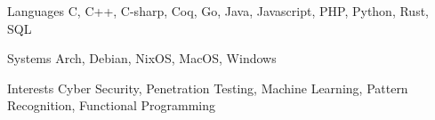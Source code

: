 
\begin{cvskills}
  \cvskill
    {Languages}
    {C, C++, C-sharp, Coq, Go, Java, Javascript, PHP, Python, Rust, SQL}

  \cvskill
    {Systems}
    {Arch, Debian, NixOS, MacOS, Windows}

  \cvskill
    {Interests}
    {Cyber Security, Penetration Testing, Machine Learning, Pattern Recognition, Functional Programming}
\end{cvskills}
